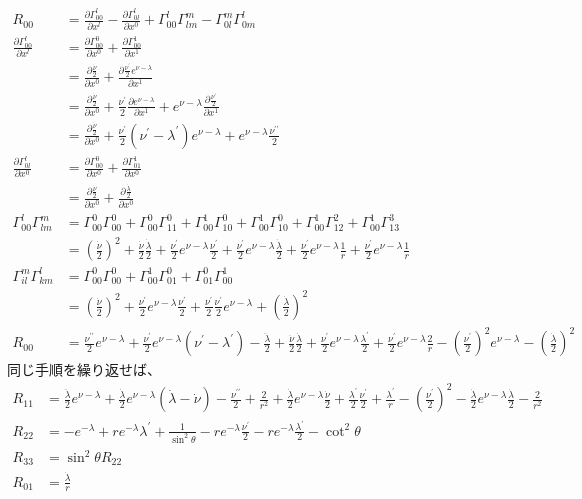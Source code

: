 \documentclass{jsarticle}
\newcommand{\pder}[2][]{\frac{\partial#1}{\partial#2}}
\newcommand{\pderx}[2][]{\pder[#1]{x^{#2}}}
\newcommand{\GaT}[3]{\Gamma^{#1}_{#2 #3}}
\newcommand{\pderGaTx}[4]{\pderx[\GaT{#1}{#2}{#3}]{#4}}
\newcommand{\Ricchiinside}[2]{\pder[\Gamma^l_{#1 #2}]{x^l} - \pder[\Gamma^l_{#1 l}]{x^{#2}} 
+ \GaT{l}{#1}{#2}\GaT{m}{l}{m} - \GaT{m}{#1}{l}\GaT{l}{#2}{m}}
\newcommand{\hnud}{\frac{\dot{\nu}}{2}}
\newcommand{\hlad}{\frac{\dot{\lambda}}{2}}
\newcommand{\hnup}{\frac{\nu^\prime}{2}}
\newcommand{\hlap}{\frac{\lambda^\prime}{2}}
\newcommand{\hnupp}{\frac{\nu^{\prime \prime}}{2}}
\newcommand{\hladd}{\frac{\ddot{\lambda}}{2}}
\newcommand{\nula}{\nu - \lambda}
\newcommand{\enula}{e^{\nula}}
\newcommand{\lap}{\lambda^\prime}
\begin{document}
\begin{align}
    R_{00} &= \Ricchiinside{0}{0}\\
    \pderGaTx{l}{0}{0}{l} &= \pderGaTx{0}{0}{0}{0} + \pderGaTx{1}{0}{0}{1}\\
                          &= \pderx[\frac{\dot{\nu}}{2}]{0} + \pderx[\frac{\nu^\prime }{2}e^{\nu - \lambda}]{1} \\
                          &= \pderx[\frac{\dot{\nu}}{2}]{0} + \frac{\nu^\prime }{2}\pderx[e^{\nu - \lambda}]{1} + e^{\nu - \lambda}\pderx[\frac{\nu^\prime }{2}]{1}\\ 
                          &= \pderx[\frac{\dot{\nu}}{2}]{0} + \frac{\nu^\prime }{2}(\nu^\prime - \lambda^\prime)e^{\nu - \lambda}
                          + e^{\nu - \lambda}\frac{\nu^{\prime \prime}}{2}\\ 
    \pderGaTx{l}{0}{l}{0} &= \pderGaTx{0}{0}{0}{0} + \pderGaTx{1}{0}{1}{0}\\
                          &= \pderx[\frac{\dot{\nu}}{2}]{0} + \pderx[\frac{\dot{\lambda}}{2}]{0}\\
    \GaT{l}{0}{0} \GaT{m}{l}{m} &= \GaT{0}{0}{0} \GaT{0}{0}{0} + \GaT{0}{0}{0} \GaT{0}{1}{1} + \GaT{1}{0}{0} \GaT{0}{1}{0} + \GaT{1}{0}{0} \GaT{0}{1}{0} + \GaT{1}{0}{0} \GaT{2}{1}{2} + \GaT{1}{0}{0} \GaT{3}{1}{3}\\
                                &= (\hnud)^2 + \hnud \hlad + \hnup e^{\nu - \lambda} \hnup + \hnup e^{\nu - \lambda} \hlad + \hnup e^{\nu - \lambda} \frac{1}{r} +\hnup e^{\nu - \lambda} \frac{1}{r}\\
                                \GaT{m}{i}{l} \GaT{l}{k}{m} &= \GaT{0}{0}{0} \GaT{0}{0}{0} + \GaT{1}{0}{0} \GaT{0}{0}{1} + \GaT{0}{0}{1} \GaT{1}{0}{0}\\
                                                            &= (\hnud)^2 + \hnup e^{\nu - \lambda} \hnup + \hnup \hnup e^{\nu - \lambda} + (\hlad)^2\\
                                R_{00} &= \hnupp \enula  + \hnup \enula (\nu^\prime - \lambda^\prime) - \hladd + \hnud \hlad + \hnup \enula \hlap + \hnup \enula \frac{2}{r} - (\hnup)^2 \enula - (\hlad)^2
\end{align}
同じ手順を繰り返せば、
\begin{align}
    R_{11} &= \hladd \enula + \hlad \enula (\dot{\lambda} - \dot{\nu}) - \hnupp + \frac{2}{r^2} + \hlad \enula \hnud + \hlap \hnup + \frac{\lap}{r} - (\hnup)^2 - \hlad \enula \hlad - \frac{2}{r^2}\\ 
    R_{22} &= -e^{-\lambda} + re^{-\lambda}\lap + \frac{1}{\sin^2\theta} - re^{-\lambda}\hnup - re^{-\lambda}\hlap - \cot^2 \theta\\
    R_{33} &= \sin^2\theta R_{22}\\
    R_{01} &= \frac{\dot{\lambda}}{r}
\end{align}
\end{document}
